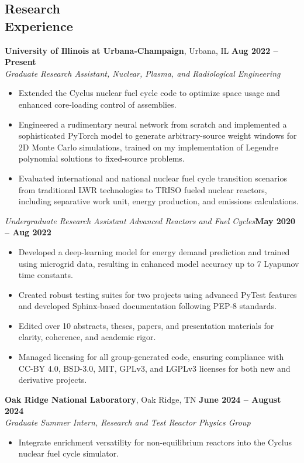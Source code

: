 \documentclass[margin,line]{resume}
\begin{document}
\begin{resume}
\section{\mysidestyle Research\\Experience}
\textbf{University of Illinois at Urbana-Champaign}, Urbana, IL \hfill \textbf{Aug 2022 -- Present} \\
\textsl{Graduate Research Assistant, Nuclear, Plasma, and Radiological Engineering} \\
\begin{itemize}
    \item Extended the Cyclus nuclear fuel cycle code to optimize space usage and enhanced core-loading control of assemblies.
    \item Engineered a rudimentary neural network from scratch and implemented a sophisticated PyTorch model to generate arbitrary-source weight windows for 2D Monte Carlo simulations, trained on my implementation of Legendre polynomial solutions to fixed-source problems.
    \item Evaluated international and national nuclear fuel cycle transition scenarios from traditional LWR technologies to TRISO fueled nuclear reactors, including separative work unit, energy production, and emissions calculations.
\end{itemize}
    \textsl{Undergraduate Research Assistant} \textsl{Advanced Reactors and Fuel Cycles}\hfill \textbf{May 2020 -- Aug 2022}\\
    \begin{itemize}
        \item Developed a deep-learning model for energy demand prediction and trained using microgrid data, resulting in enhanced model accuracy up to 7 Lyapunov time constants.
        \item Created robust testing suites for two projects using advanced PyTest features and developed Sphinx-based documentation following PEP-8 standards.
        \item Edited over 10 abstracts, theses, papers, and presentation materials for clarity, coherence, and academic rigor.
        \item Managed licensing for all group-generated code, ensuring compliance with CC-BY 4.0, BSD-3.0, MIT, GPLv3, and LGPLv3 licenses for both new and derivative projects.
    \end{itemize}

    \textbf{Oak Ridge National Laboratory}, Oak Ridge, TN \hfill \textbf{June 2024 -- August 2024} \\
    \textsl{Graduate Summer Intern, Research and Test Reactor Physics Group} \\
    \begin{itemize}
        \item Integrate enrichment versatility for non-equilibrium reactors into the Cyclus nuclear fuel cycle simulator.
    \end{itemize}


\end{resume}
\end{document}
